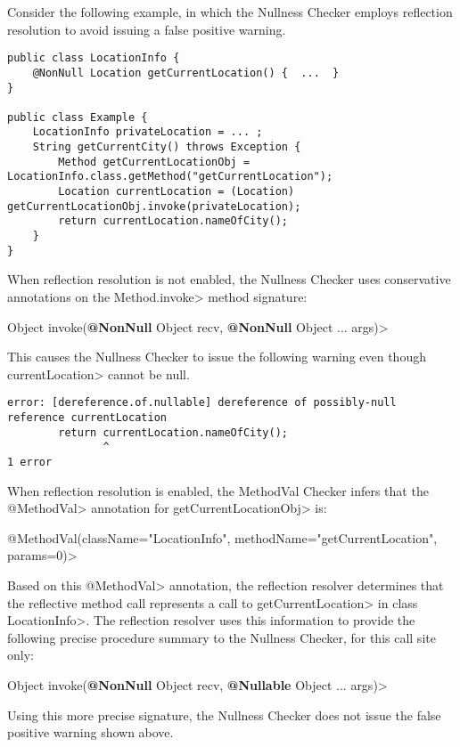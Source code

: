 
Consider the following example, in which the Nullness Checker employs
reflection resolution to avoid issuing a false positive warning.

\begin{Verbatim}
public class LocationInfo {
    @NonNull Location getCurrentLocation() {  ...  }
}

public class Example {
    LocationInfo privateLocation = ... ;
    String getCurrentCity() throws Exception {
        Method getCurrentLocationObj = LocationInfo.class.getMethod("getCurrentLocation");
        Location currentLocation = (Location) getCurrentLocationObj.invoke(privateLocation);
        return currentLocation.nameOfCity();
    }
}
\end{Verbatim}

When reflection resolution is not enabled, the Nullness Checker uses conservative
annotations on the \<Method.invoke> method signature:

\quad {} Object invoke({\bfseries @NonNull} Object recv, {\bfseries @NonNull} Object ... args)>


This causes the Nullness Checker to issue the following warning even though
\<currentLocation> cannot be null.

\begin{Verbatim}
error: [dereference.of.nullable] dereference of possibly-null reference currentLocation
        return currentLocation.nameOfCity();
               ^
1 error
\end{Verbatim}

\begin{sloppypar}
When reflection resolution is enabled, the MethodVal Checker infers that the \<@MethodVal> annotation for \<getCurrentLocationObj>  is:
\end{sloppypar}

\quad \<@MethodVal(className="LocationInfo", methodName="getCurrentLocation", params=0)>

Based on this \<@MethodVal> annotation, the reflection resolver determines that
the reflective method call represents a call to \<getCurrentLocation> in class
\<LocationInfo>.
The reflection resolver uses this information to provide the
following precise procedure summary to the Nullness Checker, for this
call site only:

\quad {} Object invoke({\bfseries @NonNull} Object recv, {\bfseries @Nullable} Object ... args)>

Using this more precise signature, the Nullness Checker does not issue the false positive warning shown above.

